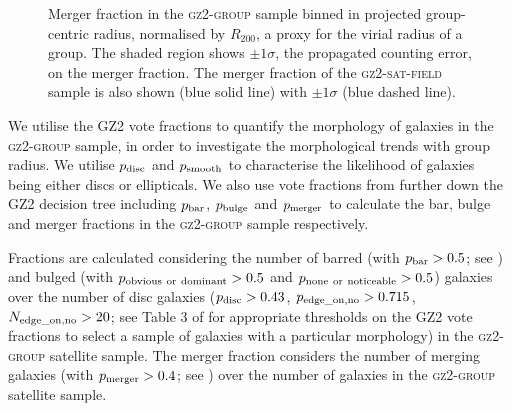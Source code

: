 \documentclass[useAMS,usenatbib]{mn2e}
\begin{document}
\begin{figure}
\caption[Merger fraction with group radius in the \textsc{gz2-group} sample]{Merger fraction in the \textsc{gz2-group} sample binned in projected group-centric radius, normalised by $R_{200}$, a proxy for the virial radius of a group. The shaded region shows $\pm1\sigma$, the propagated counting error, on the merger fraction. The merger fraction of the \textsc{gz2-sat-field} sample is also shown (blue solid line) with $\pm1\sigma$ (blue dashed line).}
\label{fig:mergerradius}
\end{figure}


We utilise the GZ2 vote fractions to quantify the morphology of galaxies in the \textsc{gz2-group} sample, in order to investigate the morphological trends with group radius. We utilise $p_{\rm{disc}}$ and $p_{\rm{smooth}}$ to characterise the likelihood of galaxies being either discs or ellipticals. We also use vote fractions from further down the GZ2 decision tree including $p_{\rm{bar}}$, $p_{\rm{bulge}}$ and $p_{\rm{merger}}$ to calculate the bar, bulge and merger fractions in the \textsc{gz2-group} sample respectively. 

Fractions are calculated considering the number of barred (with $p_{\rm{bar}} > 0.5$; see \citealt{masters11a, Cheung13}) and bulged (with $p_{\rm{obvious}~\rm{or}~\rm{dominant}} > 0.5$ and $p_{\rm{none}~\rm{or}~\rm{noticeable}} > 0.5$) galaxies over the number of disc galaxies ($p_{\rm{disc}} > 0.43$, $p_{\rm{edge\_on, no}} > 0.715$, $N_{\rm{edge\_on, no}} > 20$; see Table 3 of \citealt{GZ2} for appropriate thresholds on the GZ2 vote fractions to select a sample of galaxies with a particular morphology) in the \textsc{gz2-group} satellite sample. The merger fraction considers the number of merging galaxies (with $p_{\rm{merger}} > 0.4$; see \citealt{Darg10a}) over the number of galaxies in the \textsc{gz2-group} satellite sample. 
\end{document}
